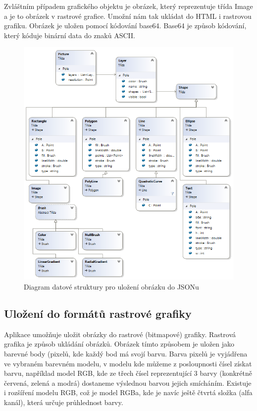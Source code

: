 \documentclass[
  field=inf,
  biblatex,
  glossaries,
  index
]{kidiplom}
\begin{document}
Zvláštním případem grafického objektu je obrázek, který reprezentuje třída Image a je to obrázek v rastrové grafice. Umožní nám tak ukládat do HTML i rastrovou grafiku. Obrázek je uložen pomocí kódování base64. Base64 je způsob kódování, který kóduje binární data do znaků ASCII.


\begin{figure}
\includegraphics[width=15cm]{img/json_diag}
\caption{Diagram datové struktury pro uložení obrázku do JSONu}
\end{figure} 


\subsection{Uložení do formátů rastrové grafiky}
Aplikace umožňuje uložit obrázky do rastrové (bitmapové) grafiky. Rastrová grafika je způsob ukládání obrázků. Obrázek tímto způsobem je uložen jako barevné body (pixelů, kde každý bod má svojí barvu. Barva pixelů je vyjádřena ve vybraném barevném modelu, v modelu kde můžeme z posloupnosti čísel získat barvu, například model RGB, kde ze třech čísel reprezentující 3 barvy (konkrétně červená, zelená a modrá) dostaneme výslednou barvou jejich smícháním. Existuje i rozšíření modelu RGB, což je model RGBa, kde je navíc ještě čtvrtá složka (alfa kanál), která určuje průhlednost barvy.
\end{document}
